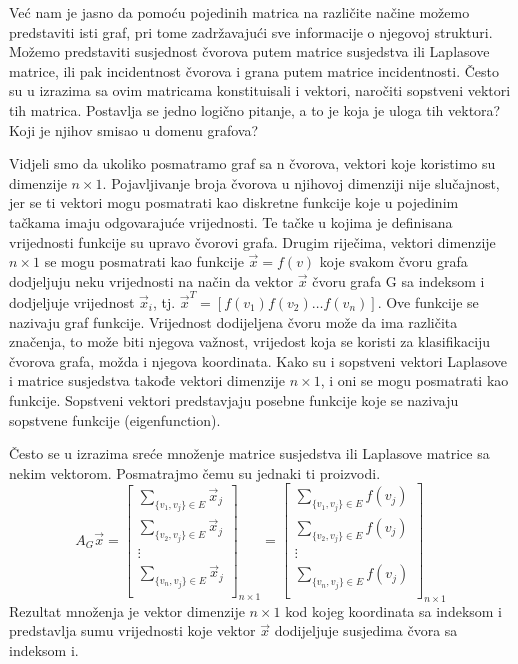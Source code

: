 \documentclass[11pt]{article}
\begin{document}
	Već nam je jasno da pomoću pojedinih matrica na različite načine možemo predstaviti isti graf, pri tome zadržavajući sve informacije o njegovoj strukturi. 
    Možemo predstaviti susjednost čvorova putem matrice susjedstva ili Laplasove matrice, ili pak incidentnost čvorova i grana putem matrice incidentnosti.
	Često su u izrazima sa ovim matricama konstituisali i vektori, naročiti sopstveni vektori tih matrica. 
	Postavlja se jedno logično pitanje, a to je koja je uloga tih vektora? Koji je njihov smisao u domenu grafova?
	
	Vidjeli smo da ukoliko posmatramo graf sa n čvorova, vektori koje koristimo su dimenzije $n \times 1$. 
	Pojavljivanje broja čvorova u njihovoj dimenziji nije slučajnost, jer se ti vektori mogu posmatrati kao diskretne funkcije koje
	u pojedinim tačkama imaju odgovarajuće vrijednosti. 
	Te tačke u kojima je definisana vrijednosti funkcije su upravo čvorovi grafa.
	Drugim riječima, vektori dimenzije $n \times 1$ se mogu posmatrati kao funkcije $\vec{x} = f(v)$ koje svakom čvoru grafa dodjeljuju neku vrijednosti na način da vektor $\vec{x}$ čvoru grafa G sa indeksom i dodjeljuje
	vrijednost $\vec{x}_i$, tj. $\vec{x}^T = [ f(v_1) f(v_2) \dots f(v_n)]$. Ove funkcije se nazivaju graf funkcije.
	Vrijednost dodijeljena čvoru može da ima različita značenja, to može biti njegova važnost, vrijedost koja se koristi za klasifikaciju čvorova grafa, možda i njegova koordinata. 
	Kako su i sopstveni vektori Laplasove i matrice susjedstva takođe vektori dimenzije $n \times 1$, i oni se mogu posmatrati kao funkcije. 
	Sopstveni vektori predstavjaju posebne funkcije koje se nazivaju sopstvene funkcije (eigenfunction).

	Često se u izrazima sreće množenje matrice susjedstva ili Laplasove matrice sa nekim vektorom. Posmatrajmo čemu su jednaki ti proizvodi.
	\[
	A_G \vec{x} = 
	\begin{bmatrix}
		\sum_{\{v_1,v_j\} \in E} \vec{x}_j \\
		\sum_{\{v_2,v_j\} \in E} \vec{x}_j \\
		\vdots \\
		\sum_{\{v_n,v_j\} \in E} \vec{x}_j \\
	\end{bmatrix}_{n \times 1} =
	\begin{bmatrix}
		\sum_{\{v_1,v_j\} \in E} f(v_j) \\
		\sum_{\{v_2,v_j\} \in E} f(v_j) \\
		\vdots \\
		\sum_{\{v_n,v_j\} \in E} f(v_j) \\
	\end{bmatrix}_{n \times 1} 
	\]
	Rezultat množenja je vektor dimenzije $n \times 1$ kod kojeg koordinata sa indeksom i predstavlja sumu vrijednosti koje vektor $\vec{x}$ dodijeljuje susjedima čvora sa indeksom i.
	
\end{document}
